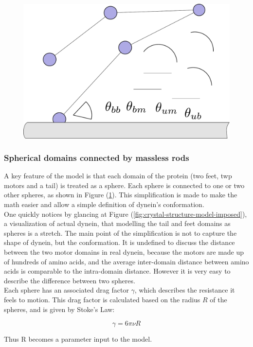 \documentclass[10pt]{article} %
\begin{document}
\begin{figure}[h]
  \centering
  \includegraphics[width=.65\textwidth,keepaspectratio]{../../figures/ob_fig}
  \caption{}
  \label{fig:model-intro}
\end{figure}

\subsubsection{Spherical domains connected by massless rods}
A key feature of the model is that each domain of the protein (two feet, twp motors and a tail) is treated as a sphere. Each sphere is connected to one or two other spheres, as shown in Figure (\ref{fig:model-intro}). This simplification is made to make the math easier and allow a simple definition of dynein's conformation.\\

One quickly notices by glancing at Figure (\ref{fig:crystal-structure-model-imposed}), a visualization of actual dynein, that modelling the tail and feet domains as spheres is a stretch. The main point of the simplification is not to capture the shape of dynein, but the conformation. It is undefined to discuss the distance between the two motor domains in real dynein, because the motors are made up of hundreds of amino acids, and the average inter-domain distance between amino acids is comparable to the intra-domain distance. However it is very easy to describe the difference between two spheres.\\

Each sphere has an associated drag factor $\gamma$, which describes the resistance it feels to motion. This drag factor is calculated based on the radius $R$ of the spheres, and is given by Stoke's Law:

\begin{equation}
  \gamma = 6\pi\nu R
\end{equation}

Thus R becomes a parameter input to the model.\\
\end{document}
